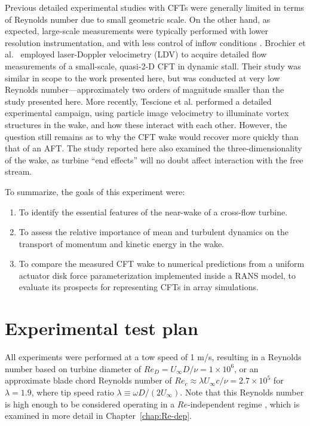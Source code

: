 Previous detailed experimental studies with CFTs were generally limited in terms
of Reynolds number due to small geometric scale. On the other hand, as expected,
large-scale measurements were typically performed with lower resolution
instrumentation, and with less control of inflow conditions
\cite{Vermeulen1979}. Brochier et al.~\cite{Brochier1986} employed laser-Doppler
velocimetry (LDV) to acquire detailed flow measurements of a small-scale,
quasi-2-D CFT in dynamic stall. Their study was similar in scope to the work
presented here, but was conducted at very low Reynolds number---approximately
two orders of magnitude smaller than the study presented here. More recently,
Tescione et al. \cite{Tescione2014} performed a detailed experimental campaign,
using particle image velocimetry to illuminate vortex structures in the wake,
and how these interact with each other. However, the question still remains as
to why the CFT wake would recover more quickly than that of an AFT. The study
reported here also examined the three-dimensionality of the wake, as turbine
``end effects'' will no doubt affect interaction with the free stream.

To summarize, the goals of this experiment were:
\begin{enumerate}
    \item To identify the essential features of the near-wake of a cross-flow
    turbine.
    
    \item To assess the relative importance of mean and turbulent dynamics on the
    transport of momentum and kinetic energy in the wake.
    
    \item To compare the measured CFT wake to numerical predictions from a
    uniform actuator disk force parameterization implemented inside a RANS
    model, to evaluate its prospects for representing CFTs in array simulations.
\end{enumerate}


\section{Experimental test plan}

All experiments were performed at a tow speed of 1 m/s, resulting in a Reynolds
number based on turbine diameter of $Re_D = U_\infty D /\nu = 1 \times 10^6$, or
an approximate blade chord Reynolds number of $Re_c \approx \lambda U_\infty
c/\nu = 2.7 \times 10^5$ for $\lambda=1.9$, where tip speed ratio $\lambda
\equiv \omega D / (2 U_\infty)$. Note that this Reynolds number is high enough
to be considered operating in a $Re$-independent regime \cite{Bravo2007,
    Bachant2014, Bachant2016-Energies}, which is examined in more detail in
Chapter~\ref{chap:Re-dep}.

